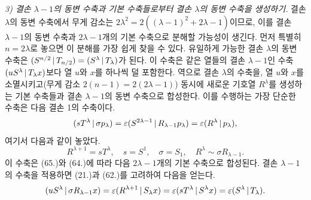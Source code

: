 \emph{3) 결손 $\lambda-1$의 동변 수축과 기본 수축들로부터 결손 $\lambda$의 동변 수축을 생성하기.} 결손 $\lambda$의 동변 수축에서 무게 감소는 $2\lambda^2=2((\lambda-1)^2+2\lambda-1)$이므로, 이를 결손 $\lambda-1$의 동변 수축과 $2\lambda-1$개의 기본 수축으로 분해할 가능성이 생긴다. 먼저 특별히 $n=2\lambda$로 놓으면 이 분해를 가장 쉽게 찾을 수 있다. 유일하게 가능한 결손 $\lambda$의 동변 수축은 $(S^{n/2}\,|\,T_{n/2})=(S^\lambda\,|\,T_\lambda)$가 된다. 이 수축은 같은 열들의 결손 $\lambda-1$인 수축 $(uS^\lambda\,|\,T_\lambda x)$보다 열 $u$와 $x$를 하나씩 덜 포함한다. 역으로 결손 $\lambda$의 수축을, 열 $u$와 $x$를 소멸시키고(무게 감소 $2(n-1)=2(2\lambda-1)$) 동시에 새로운 기호열 $R^\lambda$를 생성하는 기본 수축들과 결손 $\lambda-1$의 동변 수축으로 합성한다. 이를 수행하는 가장 단순한 수축은 다음 결손 1의 수축이다.
\[
 (sT^\lambda\,|\,\sigma p_\lambda)=\varepsilon(S^{2\lambda-1}\,|\,R_{\lambda-1}p_\lambda)=\varepsilon(R^\lambda\,|\,p_\lambda),
\]
여기서 다음과 같이 놓았다.
\[
 R^{\lambda+1}=sT^\lambda,
 \quad s=S^1,
 \quad \sigma=S_1,
 \quad R^\lambda\sim\sigma R_{\lambda-1}.
\]
이 수축은 (65.)와 (64.)에 따라 다음 $2\lambda-1$개의 기본 수축으로 합성된다.
결손 $\lambda-1$의 수축을 적용하면 (21.)과 (62.)를 고려하여 다음을 얻는다.
\[
 (uS^\lambda\,|\,\sigma R_{\lambda-1}x)=\varepsilon(R^{\lambda+1}\,|\,S_\lambda x)
 =\varepsilon(sT^\lambda\,|\,S^\lambda x)=\varepsilon(S^\lambda\,|\,T_\lambda).
\]

